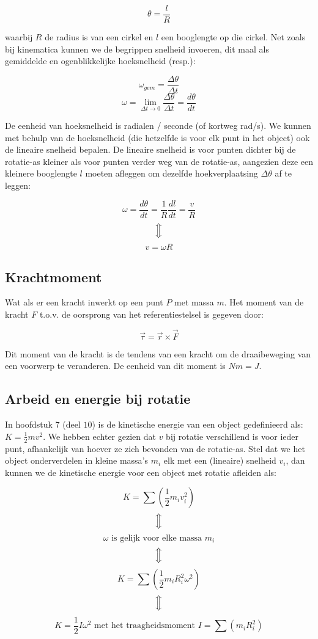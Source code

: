 \documentclass[12pt,a4paper]{article}
\newcommand{\Luda}{\Big\Updownarrow}
\begin{document}
    $$\theta = \frac{l}{R}$$ 
    
    waarbij $R$ de radius is van een cirkel en $l$ een booglengte op die cirkel. Net zoals bij kinematica kunnen we de begrippen
    snelheid invoeren, dit maal als gemiddelde en ogenblikkelijke hoeksnelheid (resp.):
    
    $$\omega_{gem} = \frac{\Delta \theta}{\Delta t}$$
    $$\omega = \lim_{\Delta t \to 0} \frac{\Delta \theta}{\Delta t} = \frac{d\theta}{dt}$$
    
    De eenheid van hoeksnelheid is radialen / seconde (of kortweg rad/s). We kunnen met behulp van de hoeksnelheid
    (die hetzelfde is voor elk punt in het object) ook de lineaire snelheid bepalen. De lineaire snelheid is voor punten dichter
    bij de rotatie-as kleiner als voor punten verder weg van de rotatie-as, aangezien deze een kleinere booglengte $l$
    moeten afleggen om dezelfde hoekverplaatsing $\Delta \theta$ af te leggen:
    
    $$\omega = \frac{d\theta}{dt} = \frac{1}{R} \frac{dl}{dt} = \frac{v}{R}$$
    $$\Luda$$
    $$v = \omega R$$

    \subsection{Krachtmoment}
    Wat als er een kracht inwerkt op een punt $P$ met massa $m$. Het moment van de kracht $F$ 
    t.o.v. de oorsprong van het referentiestelsel is gegeven door:
    
    $$\vec{\tau} = \vec{r} \times \vec{F}$$
    
    Dit moment van de kracht is de tendens van een kracht om de draaibeweging van een voorwerp
    te veranderen.  De eenheid van dit moment is $Nm = J$. 
    
    \subsection{Arbeid en energie bij rotatie}
    In hoofdstuk $7$ (deel $10$) is de kinetische energie van een object gedefinieerd als: $K = \frac{1}{2}mv^{2}$. We
    hebben echter gezien dat $v$ bij rotatie verschillend is voor ieder punt, afhankelijk van hoever ze zich bevonden van
    de rotatie-as. Stel dat we het object onderverdelen in kleine massa's $m_i$ elk met een (lineaire) snelheid $v_i$, dan kunnen
    we de kinetische energie voor een object met rotatie afleiden als:
    
    $$K = \sum \left( \frac{1}{2} m_{i} v_{i}^{2}\right)$$
    $$\Luda$$
    $$\omega \textrm{ is gelijk voor elke massa } m_{i}$$
    $$\Luda$$
    $$K = \sum \left( \frac{1}{2} m_{i} R_{i}^{2}\omega^{2}\right)$$
    $$\Luda$$
    $$K = \frac{1}{2} I\omega^{2} \textrm{ met het traagheidsmoment } I = \sum \left(m_{i} R_{i}^{2}\right)$$
    
\end{document}
